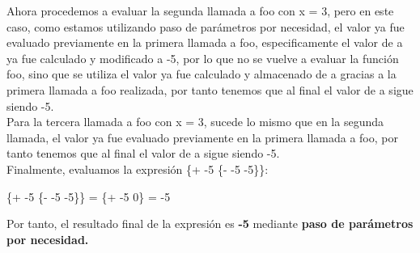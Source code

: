 \documentclass[11pt]{article}
\begin{document}
\begin{enumerate}[leftmargin=0.8cm]
    Ahora procedemos a evaluar la segunda llamada a foo con x = 3, pero en este caso, como estamos utilizando paso de parámetros por necesidad, el valor ya fue evaluado previamente en la primera llamada a foo, especificamente el valor de a ya fue calculado y modificado a -5, por lo que no se vuelve a evaluar la función foo, sino que se utiliza el valor ya fue calculado y almacenado de a gracias a la primera llamada a foo realizada, por tanto tenemos que al final el valor de a sigue siendo -5.\\ 
    Para la tercera llamada a foo con x = 3, sucede lo mismo que en la segunda llamada, el valor ya fue evaluado previamente en la primera llamada a foo, por tanto tenemos que al final el valor de a sigue siendo -5.\\

    Finalmente, evaluamos la expresión \{+ -5 \{- -5 -5\}\}:
    \begin{center}
        \{+ -5 \{- -5 -5\}\} = \{+ -5 0\} = -5
    \end{center}
    Por tanto, el resultado final de la expresión es \textbf{-5} mediante \textbf{paso de parámetros por necesidad.}\\


\end{enumerate}
\end{document}

